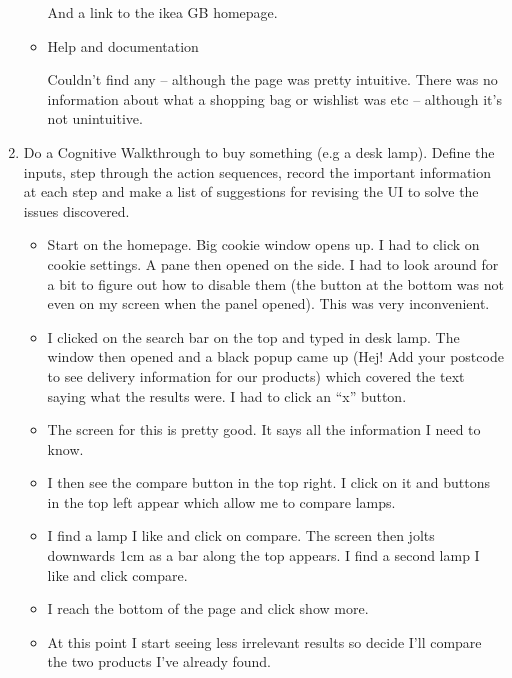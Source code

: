 \documentclass[10pt,\jkfside,a4paper]{article}
\begin{document}
\begin{enumerate}
\begin{itemize}
And a link to the ikea GB homepage.

\item Help and documentation

Couldn't find any -- although the page was pretty intuitive. There was no information about what a
shopping bag or wishlist was etc -- although it's not unintuitive.

\end{itemize}

\item Do a Cognitive Walkthrough to buy something (e.g a desk lamp). Define the
inputs, step through the action sequences, record the important information at
each step and make a list of suggestions for revising the UI to solve the issues
discovered.

\begin{itemize}

\item Start on the homepage. Big cookie window opens up. I had to click on cookie
settings. A pane then opened on the side. I had to look around for a bit to figure
out how to disable them (the button at the bottom was not even on my screen when the
panel opened). This was very inconvenient.

\item I clicked on the search bar on the top and typed in desk lamp. The window
then opened and a black popup came up (Hej! Add your postcode to see delivery information for
our products) which covered the text saying what the results were. I had to click an
``x'' button.

\item The screen for this is pretty good. It says all the information I need to
know.

\item I then see the compare button in the top right. I click on it and buttons in
the top left appear which allow me to compare lamps.

\item I find a lamp I like and click on compare. The screen then jolts downwards
1cm as a bar along the top appears. I find a second lamp I like and click compare.

\item I reach the bottom of the page and click show more.

\item At this point I start seeing less irrelevant results so decide I'll compare the
two products I've already found.


\end{itemize}
\end{enumerate}
\end{document}
